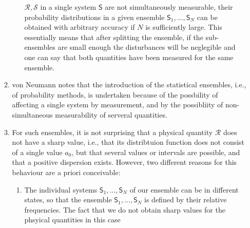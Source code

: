 \documentclass[a4paper]{article}
\theoremstyle{definition}
\theoremstyle{plain}
\begin{document}
\begin{enumerate}
\begin{enumerate}
\begin{enumerate}
                            $\mathcal{R},\mathcal{S}$ in a
                            single system $\mathsf{S}$ are
                            not simultaneously measurable,
                            their probability distributions
                            in a given ensemble
                            $\mathsf{S}_1,\ldots,\mathsf{S}_N$ 
                            can be obtained with arbitrary
                            accuracy if $N$ is sufficiently
                            large. {\color{blue} This
                            essentially means that after
                            splitting the ensemble, if the
                            sub-ensembles are small enough
                            the disturbances will be
                            neglegible and one can say that
                            both quantities have been
                            measured for the same ensemble.}
                    \end{enumerate}
            \item von Neumann notes that the
                introduction of the statistical
                ensembles, i.e., of probability methods,
                is undertaken because of the possbility
                of affecting a single system by
                measurement, and by the possibliity of
                non-simultaneous measurability of
                serveral quantities.
            \item For such ensembles, it is not
                surprising that a physical quantity
                $\mathcal{R}$ does not have a sharp
                value, i.e., that its distribtuion
                function does not consist of a single
                value $a_0$, but that several values or
                intervals are possible, and that a
                positive dispersion exists. However, two
                different reasons for this behaviour are
                a priori conceivable:
                \begin{enumerate}
                    \item The individual systems
                        $\mathsf{S}_1,\ldots,\mathsf{S}_N$ 
                        of our ensemble can be in
                        different states, so that the
                        ensemble
                        $\mathsf{S}_1,\ldots,\mathsf{S}_N$ 
                        is defined by their relative
                        frequencies. The fact that we do
                        not obtain sharp values for the
                        phsyical quantities in this case

\end{enumerate}
\end{enumerate}
\end{enumerate}
\end{document}
